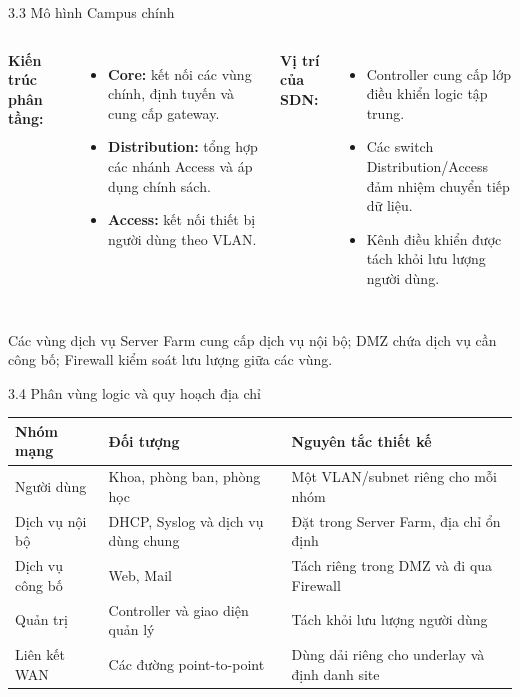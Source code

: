 \begin{frame}{3.3 Mô hình Campus chính}
    \begin{columns}[T]
        \textbf{Kiến trúc phân tầng:}
        \begin{itemize}
            \item \textbf{Core:} kết nối các vùng chính, định tuyến và cung cấp gateway.
            \item \textbf{Distribution:} tổng hợp các nhánh Access và áp dụng chính sách.
            \item \textbf{Access:} kết nối thiết bị người dùng theo VLAN.
        \end{itemize}

        \textbf{Vị trí của SDN:}
        \begin{itemize}
            \item Controller cung cấp lớp điều khiển logic tập trung.
            \item Các switch Distribution/Access đảm nhiệm chuyển tiếp dữ liệu.
            \item Kênh điều khiển được tách khỏi lưu lượng người dùng.
        \end{itemize}
    \end{columns}
    \vspace{0.15cm}
    \begin{block}{Các vùng dịch vụ}
        Server Farm cung cấp dịch vụ nội bộ; DMZ chứa dịch vụ cần công bố; Firewall kiểm soát lưu lượng giữa các vùng.
    \end{block}
\end{frame}

\begin{frame}{3.4 Phân vùng logic và quy hoạch địa chỉ}
    \begin{table}
        \centering
        \small
        \renewcommand{\arraystretch}{1.3}
        \begin{tabular}{|p{}|p{}|p{}|}
            \hline
            \rowcolor{primaryDark!15}
            \textbf{Nhóm mạng} & \textbf{Đối tượng} & \textbf{Nguyên tắc thiết kế} \\
            \hline
            Người dùng & Khoa, phòng ban, phòng học & Một VLAN/subnet riêng cho mỗi nhóm \\
            \hline
            Dịch vụ nội bộ & DHCP, Syslog và dịch vụ dùng chung & Đặt trong Server Farm, địa chỉ ổn định \\
            \hline
            Dịch vụ công bố & Web, Mail & Tách riêng trong DMZ và đi qua Firewall \\
            \hline
            Quản trị & Controller và giao diện quản lý & Tách khỏi lưu lượng người dùng \\
            \hline
            Liên kết WAN & Các đường point-to-point & Dùng dải riêng cho underlay và định danh site \\
            \hline
        \end{tabular}
    \end{table}
\end{frame}

